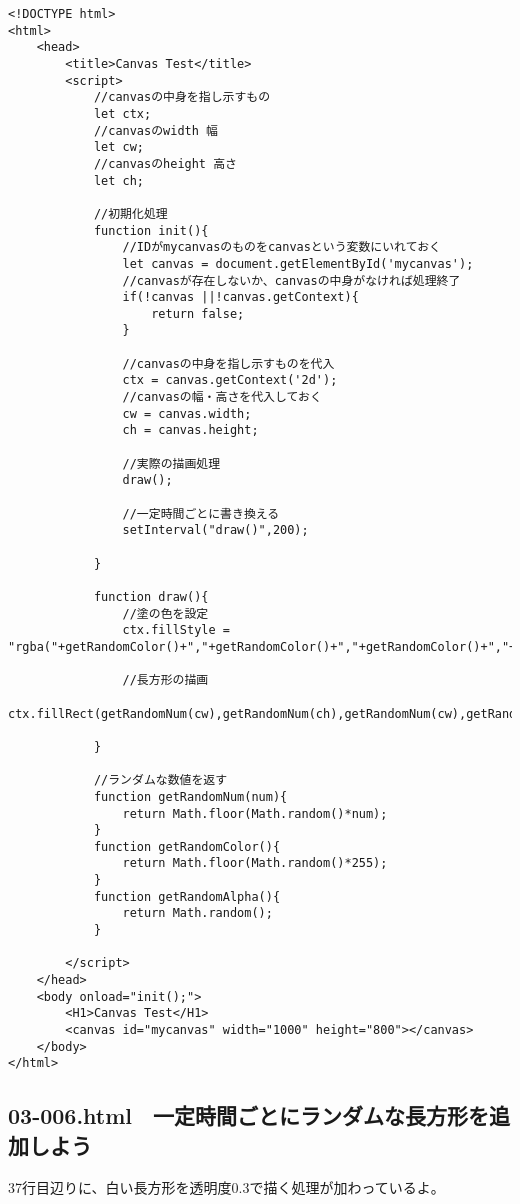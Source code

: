 \documentclass[mingoth,11pt,a4j,uplatex]{jsarticle}
\begin{document}
\begin{lstlisting}[caption=一定時間ごとにランダムな長方形を描こう]
<!DOCTYPE html>
<html>
	<head>
		<title>Canvas Test</title>
		<script>
			//canvasの中身を指し示すもの
			let ctx;
			//canvasのwidth 幅
			let cw;
			//canvasのheight 高さ
			let ch;
			
			//初期化処理
			function init(){
				//IDがmycanvasのものをcanvasという変数にいれておく
				let canvas = document.getElementById('mycanvas');
				//canvasが存在しないか、canvasの中身がなければ処理終了
				if(!canvas ||!canvas.getContext){
					return false;
				}
				
				//canvasの中身を指し示すものを代入
				ctx = canvas.getContext('2d');
				//canvasの幅・高さを代入しておく
				cw = canvas.width;
				ch = canvas.height;
				
				//実際の描画処理
				draw();
				
				//一定時間ごとに書き換える
				setInterval("draw()",200);

			}
			
			function draw(){
				//塗の色を設定
				ctx.fillStyle = "rgba("+getRandomColor()+","+getRandomColor()+","+getRandomColor()+","+getRandomAlpha()+")";
				
				//長方形の描画
				ctx.fillRect(getRandomNum(cw),getRandomNum(ch),getRandomNum(cw),getRandomNum(ch));

			}
			
			//ランダムな数値を返す
			function getRandomNum(num){
				return Math.floor(Math.random()*num);
			}
			function getRandomColor(){
				return Math.floor(Math.random()*255);
			}
			function getRandomAlpha(){
				return Math.random();
			}

		</script>
	</head>
	<body onload="init();">
		<H1>Canvas Test</H1>
		<canvas id="mycanvas" width="1000" height="800"></canvas>
	</body>
</html>
\end{lstlisting}

\subsection{03-006.html　一定時間ごとにランダムな長方形を追加しよう}
37行目辺りに、白い長方形を透明度0.3で描く処理が加わっているよ。
\end{document}
